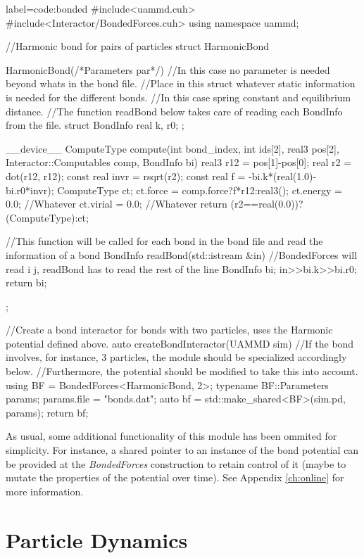 \documentclass[ twoside,openright,titlepage,numbers=noenddot,%
headinclude,footinclude,cleardoublepage=empty,abstract=on,
BCOR=5mm,paper=a4,fontsize=11pt, dvipsnames
]{scrreprt}
\begin{document}
\begin{code2} {label=code:bonded}
#include<uammd.cuh>
#include<Interactor/BondedForces.cuh>
using namespace uammd;

//Harmonic bond for pairs of particles
struct HarmonicBond{
  HarmonicBond(/*Parameters par*/){
    //In this case no parameter is needed beyond whats in the bond file.
  }
  //Place in this struct whatever static information is needed for the different bonds.
  //In this case spring constant and equilibrium distance.
  //The function readBond below takes care of reading each BondInfo from the file.
  struct BondInfo{
    real k, r0;
  };

  __device__ ComputeType compute(int bond_index, int ids[2], real3 pos[2],
                                 Interactor::Computables comp, BondInfo bi){
    real3 r12 = pos[1]-pos[0];
    real r2 = dot(r12, r12);
    const real invr = rsqrt(r2);
    const real f = -bi.k*(real(1.0)-bi.r0*invr);
    ComputeType ct;
    ct.force = comp.force?f*r12:real3();
    ct.energy = 0.0; //Whatever
    ct.virial = 0.0; //Whatever
    return (r2==real(0.0))?(ComputeType{}):ct;
  }

  //This function will be called for each bond in the bond file and read the information of a bond
  BondInfo readBond(std::istream &in){
    //BondedForces will read i j, readBond has to read the rest of the line
    BondInfo bi;
    in>>bi.k>>bi.r0;
    return bi;
  }
};

//Create a bond interactor for bonds with two particles, uses the Harmonic potential defined above.
auto createBondInteractor(UAMMD sim){
  //If the bond involves, for instance, 3 particles, the module should be specialized accordingly below.
  //Furthermore, the potential should be modified to take this into account.
  using BF = BondedForces<HarmonicBond, 2>;
  typename BF::Parameters params;
  params.file = "bonds.dat";
  auto bf = std::make_shared<BF>(sim.pd, params);
  return bf;
}

\end{code2}

As usual, some additional functionality of this module has been ommited for simplicity. For instance, a shared pointer to an instance of the bond potential can be provided at the \emph{BondedForces} construction to retain control of it (maybe to mutate the properties of the potential over time). See Appendix \ref{ch:online} for more information.

\chapter{Particle Dynamics}\label{sec:dynamics}
\end{document}
